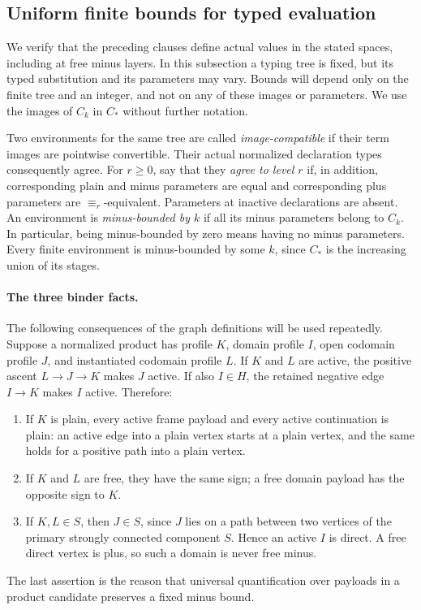 \subsection{Uniform finite bounds for typed evaluation}
\label{obs:bound-section}

We verify that the preceding clauses define actual values in the stated
spaces, including at free minus layers.  In this subsection a typing tree
is fixed, but its typed substitution and its parameters may vary.  Bounds
will depend only on the finite tree and an integer, and not on any of
these images or parameters.  We use the images of $C_k$ in $C_*$ without
further notation.

Two environments for the same tree are called \emph{image-compatible} if their
term images are pointwise convertible.  Their actual normalized
declaration types consequently agree.  For $r\geq 0$, say that they
\emph{agree to level $r$} if, in addition, corresponding plain and minus
parameters are equal and corresponding plus parameters are
$\equiv_r$-equivalent.  Parameters at inactive declarations are absent.
An environment is \emph{minus-bounded by $k$} if all its minus parameters
belong to $C_k$.  In particular, being minus-bounded by zero means having
no minus parameters.  Every finite environment is minus-bounded by some
$k$, since $C_*$ is the increasing union of its stages.

\paragraph{The three binder facts.}
\label{obs:bound-binder-facts}
The following consequences of the graph definitions will be used
repeatedly.  Suppose a normalized product has profile $K$, domain profile
$I$, open codomain profile $J$, and instantiated codomain profile $L$.
If $K$ and $L$ are active, the positive ascent $L\longrightarrow
J\longrightarrow K$ makes $J$ active.  If also $I\in H$, the retained
negative edge $I\longrightarrow K$ makes $I$ active.  Therefore:
\begin{enumerate}
\item If $K$ is plain, every active frame payload and every active
continuation is plain: an active edge into a plain vertex starts at a
plain vertex, and the same holds for a positive path into a plain vertex.
\item If $K$ and $L$ are free, they have the same sign; a free domain
payload has the opposite sign to $K$.
\item If $K,L\in S$, then $J\in S$, since $J$ lies on a path between two
vertices of the primary strongly connected component $S$.  Hence an
active $I$ is direct.  A free direct vertex is plus, so such a domain is
never free minus.
\end{enumerate}
The last assertion is the reason that universal quantification over
payloads in a product candidate preserves a fixed minus bound.


